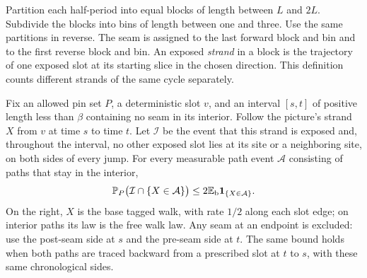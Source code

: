 Partition each half-period into equal blocks of length between $L$ and
$2L$.  Subdivide the blocks into bins of length between one and three.
Use the same partitions in reverse.  The seam is assigned to the last
forward block and bin and to the first reverse block and bin.  An
exposed \emph{strand} in a block is the trajectory of one exposed slot
at its starting slice in the chosen direction.  This definition counts
different strands of the same cycle separately.

\begin{lemma}\label{lem:isolatedpath}
Fix an allowed pin set $P$, a deterministic slot $v$, and an interval
$[s,t]$ of positive length less than $\beta$ containing no seam in its
interior.  Follow the picture's strand $X$ from $v$ at time $s$ to
time $t$.  Let $\mathcal I$ be the event that this strand is exposed
and, throughout the interval, no other exposed slot lies at its site
or a neighboring site, on both sides of every jump.  For every
measurable path event $\mathcal A$ consisting of paths that stay in
the interior,
\begin{equation}\label{eq:isolateddomination}
 \mathbb P_P\bigl(\mathcal I\cap\{X\in\mathcal A\}\bigr)
       \le2\mathbb E_{\mathrm b}\mathbf 1_{\{X\in\mathcal A\}}.
\end{equation}
On the right, $X$ is the base tagged walk, with rate $1/2$ along each
slot edge; on interior paths its law is the free walk law.  Any seam
at an endpoint is excluded: use the post-seam side at $s$ and the
pre-seam side at $t$.  The same bound holds when both paths are traced
backward from a prescribed slot at $t$ to $s$, with these same
chronological sides.
\end{lemma}

